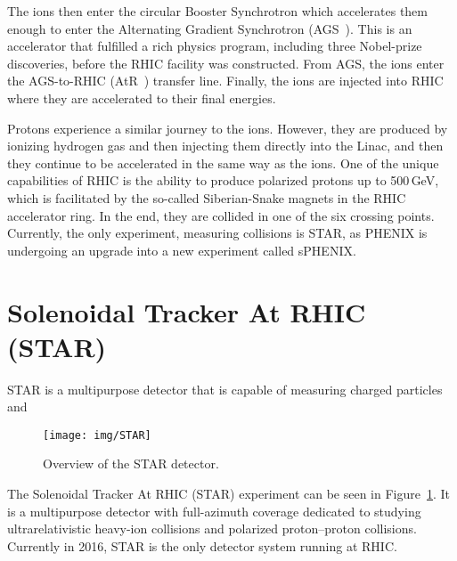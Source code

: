 The ions then enter the circular Booster Synchrotron which accelerates them enough to enter the Alternating Gradient Synchrotron (AGS~\cite{AGS}). This is an accelerator that fulfilled a rich physics program, including three Nobel-prize discoveries, before the RHIC facility was constructed. From AGS, the ions enter the AGS-to-RHIC (AtR~\cite{AtR}) transfer line. Finally, the ions are injected into RHIC where they are accelerated to their final energies. 

Protons experience a similar journey to the ions. However, they are produced by ionizing hydrogen gas and then injecting them directly into the Linac, and then they continue to be accelerated in the same way as the ions. One of the unique capabilities of RHIC is the ability to produce polarized protons up to 500$\,$GeV, which is facilitated by the so-called Siberian-Snake magnets in the RHIC accelerator ring. In the end, they are collided in one of the six crossing points. Currently, the only experiment, measuring collisions is STAR, as PHENIX is undergoing an upgrade into a new experiment called sPHENIX\@.





\section{Solenoidal Tracker At RHIC (STAR)}

STAR is a multipurpose detector that is capable of measuring charged particles and 

\begin{figure}[htb]
\begin{center}
 \texttt{[image: img/STAR]}\\
\end{center}
\caption{\label{STAR}Overview of the STAR detector.}
\end{figure}

The Solenoidal Tracker At RHIC (STAR) experiment \cite{STARoverview} can be seen in Figure~\ref{STAR}. It is a multipurpose detector with full-azimuth
coverage dedicated to
studying ultrarelativistic heavy-ion collisions and polarized proton--proton collisions. Currently in 2016, STAR is the
only detector system running at RHIC\@.

